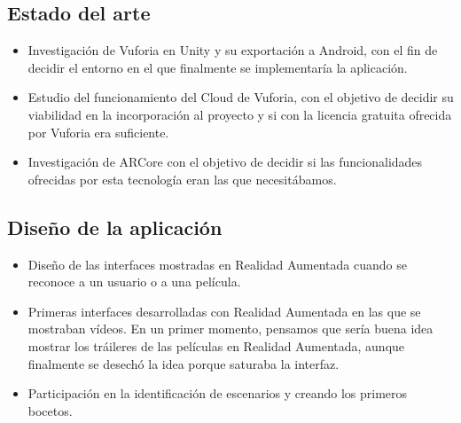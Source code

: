             \subsection{Estado del arte}
            \label{makereference7.3.1}
                \begin{itemize}
                    \item Investigación de Vuforia en Unity y su exportación a Android, con el fin de decidir el entorno en el que 
                    finalmente se implementaría la aplicación. 
                    \item Estudio del funcionamiento del Cloud de Vuforia, con el objetivo de decidir su viabilidad en la incorporación 
                    al proyecto y si con la licencia gratuita ofrecida por Vuforia era suficiente. 
                    \item Investigación de ARCore con el objetivo de decidir si las funcionalidades ofrecidas por esta tecnología eran las que necesitábamos.
                \end{itemize}
            \subsection{Diseño de la aplicación}
            \label{makereference7.3.2}
                \begin{itemize}
                    \item Diseño de las interfaces mostradas en Realidad Aumentada cuando se reconoce a un usuario o a una película. 
                    \item Primeras interfaces desarrolladas con Realidad Aumentada en las que se mostraban vídeos. En un primer momento, 
                    pensamos que sería buena idea mostrar los tráileres de las películas en Realidad Aumentada, aunque finalmente se desechó la idea porque saturaba la interfaz.
                    \item Participación en la identificación de escenarios y creando los primeros bocetos.
                \end{itemize}
